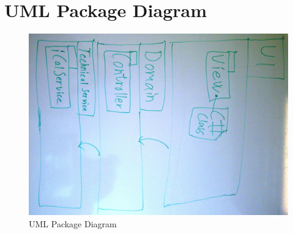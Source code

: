 \section{UML Package Diagram}
\begin{figure}[h!]
  \includegraphics[width=\textwidth,natwidth=1720,natheight=2450]{illustrations/UMLPackageDiagram.jpg}
  \caption{UML Package Diagram}
\end{figure}
\newpage